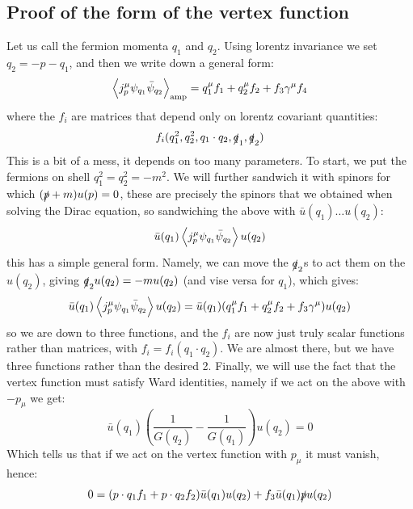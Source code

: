 \subsection{Proof of the form of the vertex function}
Let us call the fermion momenta $q_1$ and $q_2$. Using lorentz invariance we set $q_2 = -p - q_1$, and then we write down a general form:
\begin{equation}
    \left< j^\mu_p \psi_{q_1}\bar{\psi}_{q_2} \right>_{\text{amp}} = q_1^\mu f_1 + q_2^\mu f_2 + f_3 \gamma^\mu f_4
\end{equation}
where the $f_i$ are matrices that depend only on lorentz covariant quantities:
\begin{equation}
    f_i(q_1^2, q_2^2, q_1\cdot q_2, \slashed{q}_1, \slashed{q}_2)
\end{equation}
This is a bit of a mess, it depends on too many parameters. To start, we put the fermions on shell $q_1^2 = q_2^2 = -m^2$. We will further sandwich it with spinors for which $(\slashed{p} + m)u(p) = 0$, these are precisely the spinors that we obtained when solving the Dirac equation, so sandwiching the above with $\bar{u}(q_1)\ldots u(q_2)$:
\begin{equation}
    \bar{u}(q_1)\left< j^\mu_p \psi_{q_1}\bar{\psi}_{q_2} \right>u(q_2)
\end{equation}
this has a simple general form. Namely, we can move the $\slashed{q}_2$s to act them on the $u(q_2)$, giving $\slashed{q}_2u(q_2) = -mu(q_2)$ (and vise versa for $q_1$), which gives:
\begin{equation}
    \bar{u}(q_1)\left< j^\mu_p \psi_{q_1}\bar{\psi}_{q_2} \right>u(q_2) = \bar{u}(q_1)(q_1^\mu f_1 + q_2^\mu f_2 + f_3\gamma^\mu)u(q_2)
\end{equation}
so we are down to three functions, and the $f_i$ are now just truly scalar functions rather than matrices, with $f_i = f_i(q_1 \cdot q_2)$. We are almost there, but we have three functions rather than the desired 2. Finally, we will use the fact that the vertex function must satisfy Ward identities, namely if we act on the above with $-p_\mu$ we get:
\begin{equation}
    \bar{u}(q_1)\left(\frac{1}{G(q_2)} - \frac{1}{G(q_1)}\right)u(q_2) = 0
\end{equation}
Which tells us that if we act on the vertex function with $p_\mu$ it must vanish, hence:
\begin{equation}
    0 = (p \cdot q_1 f_1 + p \cdot q_2 f_2)\bar{u}(q_1)u(q_2) + f_3\bar{u}(q_1)\slashed{p}u(q_2)
\end{equation}
